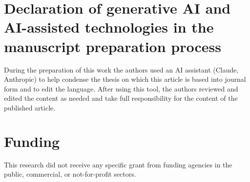 \documentclass[5p,times,twocolumn]{elsarticle}
\begin{document}
\section*{Declaration of generative AI and AI-assisted technologies in the manuscript preparation process}
During the preparation of this work the authors used an AI assistant (Claude, Anthropic) to help condense the thesis on which this article is based into journal form and to edit the language. After using this tool, the authors reviewed and edited the content as needed and take full responsibility for the content of the published article.

\section*{Funding}
This research did not receive any specific grant from funding agencies in the public, commercial, or not-for-profit sectors.



\end{document}
